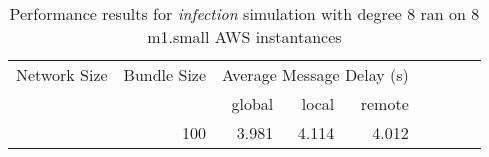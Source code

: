 	    

\begin{table}
	  \caption[Performance results, \emph{infection:8 on 8 m1.small instances }]{ Performance results for \emph{ infection } simulation with degree 8 ran on 8 m1.small AWS instantances }
	\begin{tabular}{rrrrrrrrr}
	\hline\noalign{\smallskip}

	Network Size &
	Bundle Size &
	\multicolumn{3}{c}{Average Message Delay (s)}  \\

	 & 
     & global & local & remote\\

			
				\noalign{\smallskip}\hline
				\multirow{ 1 }{*}{ 1000000 } &
				
					
					 
					\multirow{ 1 }{*}{ 100 } &
					
						
							    
							    
	                           3.981 & 4.114 & 4.012  \\
	                
	            
	        

\hline

\end{tabular}
\end{table}
\clearpage


	    
	


